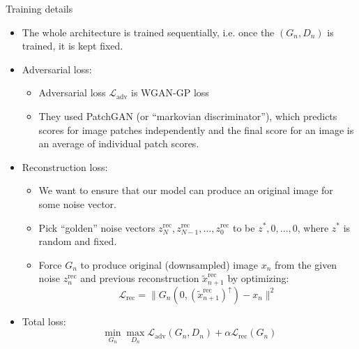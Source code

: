\documentclass[handout, 10pt]{beamer}
\begin{document}
\begin{frame}{Training details}
    \begin{itemize}
        \item\pause The whole architecture is trained sequentially, i.e. once the $(G_n, D_n)$ is trained, it is kept fixed.
        \item\pause Adversarial loss:
        \begin{itemize}
            \item\pause Adversarial loss $\mathcal{L}_{\mathrm{adv}}$ is WGAN-GP loss
            \item\pause They used PatchGAN (or ``markovian discriminator''), which predicts scores for image patches independently and the final score for an image is an average of individual patch scores.
        \end{itemize}
        \item\pause Reconstruction loss:
        \begin{itemize}
            \item\pause We want to ensure that our model can produce an original image for some noise vector.
            \item\pause Pick ``golden'' noise vectors $z_N^\text{rec}, z_{N-1}^\text{rec}, ..., z_0^\text{rec}$ to be $z^*, 0, ..., 0$, where $z^*$ is random and fixed.
            \item\pause Force $G_n$ to produce original (downsampled) image $x_n$ from the given noise $z_n^\text{rec}$ and previous reconstruction $\tilde{x}_{n+1}^{\mathrm{rec}}$ by optimizing:
            \begin{equation}
\mathcal{L}_{\mathrm{rec}}= \|G_{n}(0,\left(\tilde{x}_{n+1}^{\mathrm{rec}}\right)^\uparrow)-x_{n} \|^{2}
\end{equation}
        \end{itemize}
        \item\pause Total loss: 
        \begin{equation}
\min _{G_{n}} \max _{D_{n}} \mathcal{L}_{\mathrm{adv}}\left(G_{n}, D_{n}\right)+\alpha \mathcal{L}_{\mathrm{rec}}\left(G_{n}\right)
\end{equation}
    \end{itemize}
\end{frame}
\end{document}

